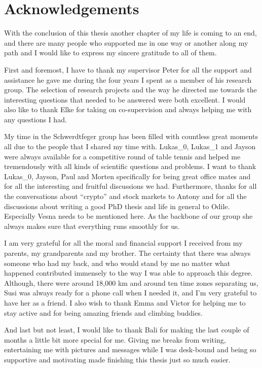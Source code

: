 
\chapter*{Acknowledgements}

With the conclusion of this thesis another chapter of my life is coming to an
end, and there are many people who supported me in one way or another along my
path and I would like to express my sincere gratitude to all of them.

First and foremost, I have to thank my supervisor Peter for all the support and
assistance he gave me during the four years I spent as a member of his research
group. The selection of research projects and the way he directed me towards the
interesting questions that needed to be answered were both excellent. I would
also like to thank Elke for taking on co-supervision and always helping me with
any questions I had.

My time in the Schwerdtfeger group has been filled with countless great moments
all due to the people that I shared my time with. Lukas\_0, Lukas\_1 and
Jayson were always available for a competitive round of table tennis and helped
me tremendously with all kinds of scientific questions and problems. I want to
thank Lukas\_0, Jayson, Paul and Morten specifically for being great office
mates and for all the interesting and fruitful discussions we had. Furthermore,
thanks for all the conversations about ``crypto'' and stock markets to Antony
and for all the discussions about writing a good PhD thesis and life in general
to Odile. Especially Vesna needs to be mentioned here. As the backbone of our
group she always makes sure that everything runs smoothly for us.

I am very grateful for all the moral and financial support I received from my
parents, my grandparents and my brother. The certainty that there was always
someone who had my back, and who would stand by me no matter what happened
contributed immensely to the way I was able to approach this degree. Although,
there were around 18,000 km and around ten time zones separating us, Susi was
always ready for a phone call when I needed it, and I'm very grateful to have
her as a friend. I also wish to thank Emma and Victor for helping me to stay
active and for being amazing friends and climbing buddies. 

And last but not least, I would like to thank Bali for making the last couple of
months a little bit more special for me. Giving me breaks from writing,
entertaining me with pictures and messages while I was desk-bound and being so
supportive and motivating made finishing this thesis just so much easier.

